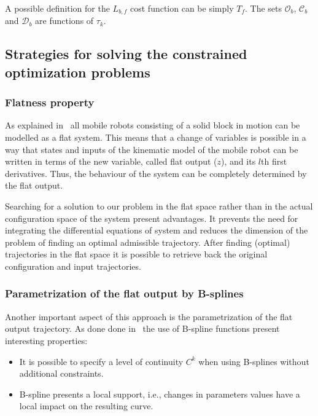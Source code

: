 \documentclass[eprint]{actapoly}
\begin{document}
A possible definition for the $L_{b,f}$ cost function can be simply $T_f$.
The sets $\mathcal{O}_b$, $\mathcal{C}_b$ and $\mathcal{D}_b$ are functions of
$\tau_k$.




\subsection{Strategies for solving the constrained optimization problems}



\subsubsection{Flatness property}

As explained in~\cite{Defoort2007a} all mobile robots consisting of a solid
block in motion can be modelled as a flat system. 
This means that a change of variables is possible in a way that states and
inputs of the kinematic model of the mobile robot can be written in terms
of the new variable, called flat output ($z$), and its $l$th first derivatives.
Thus, the behaviour of the system can be completely determined by the flat
output.


Searching for a solution to our problem in the flat space rather than in
the actual configuration space of the system present advantages.
It prevents the need for integrating the differential equations
of system and reduces the dimension of the problem of finding an optimal
admissible trajectory.
After finding (optimal) trajectories in the flat space it is possible
to retrieve back the original configuration and input trajectories.

\subsubsection{Parametrization of the flat output by B-splines}

Another important aspect of this approach is the parametrization of 
the flat output trajectory. As done done in~\cite{milam2003} the use
of B-spline functions present interesting properties:


\begin{itemize}


 \item It is possible to specify a level of continuity $C^k$ when using
 B-splines without additional constraints.
 
 \item B-spline presents a local support, i.e., changes in parameters values have a local
 impact on the resulting curve.
 
 
\end{itemize}
\end{document}
